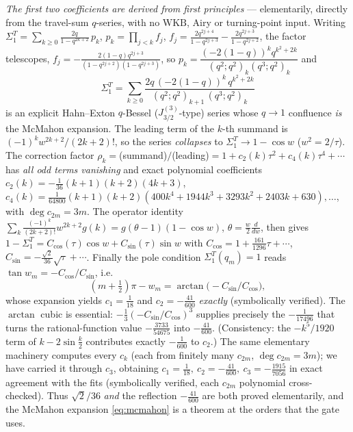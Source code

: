 \emph{The first two coefficients are derived from first principles} --- elementarily, directly from the
travel-sum $q$-series, with no $\mathrm{WKB}$, Airy or turning-point input. Writing
$\Sigma_1^T=\sum_{k\ge0}\frac{2q}{1-q^{2k+2}}\,p_k$, $p_k=\prod_{j<k}f_j$,
$f_j=\frac{2q^{2j+4}}{1-q^{2j+3}}-\frac{2q^{2j+3}}{1-q^{2j+2}}$, the factor telescopes,
$f_j=-\tfrac{2(1-q)q^{2j+3}}{(1-q^{2j+2})(1-q^{2j+3})}$, so $p_k=\dfrac{(-2(1-q))^kq^{k^2+2k}}{(q^2;q^2)_k(q^3;q^2)_k}$
and
\begin{equation}\label{eq:sigtclosed}
  \Sigma_1^T=\sum_{k\ge0}\frac{2q\,(-2(1-q))^k\,q^{k^2+2k}}{(q^2;q^2)_{k+1}\,(q^3;q^2)_k}
\end{equation}
is an explicit Hahn--Exton $q$-Bessel ($J^{(3)}_{3/2}$-type) series whose $q\to1$ confluence \emph{is} the McMahon
expansion. The leading term of the $k$-th summand is
$(-1)^kw^{2k+2}/(2k+2)!$, so the series \emph{collapses} to $\Sigma_1^T\to1-\cos w$ ($w^2=2/\tau$). The
correction factor $\rho_k=$(summand)$/$(leading)$=1+c_2(k)\tau^2+c_4(k)\tau^4+\cdots$ has \emph{all odd terms
vanishing} and exact polynomial coefficients $c_2(k)=-\tfrac1{36}(k+1)(k+2)(4k+3)$, $c_4(k)=\tfrac1{64800}
(k+1)(k+2)(400k^4+1944k^3+3293k^2+2403k+630),\dots$, with $\deg c_{2m}=3m$. The operator identity
$\sum_k\frac{(-1)^k}{(2k+2)!}w^{2k+2}g(k)=g(\theta-1)(1-\cos w)$, $\theta=\tfrac{w}2\frac{d}{dw}$, then gives
$1-\Sigma_1^T=C_{\cos}(\tau)\cos w+C_{\sin}(\tau)\sin w$ with
$C_{\cos}=1+\tfrac{161}{1296}\tau+\cdots$, $C_{\sin}=-\tfrac{\sqrt2}{36}\sqrt\tau+\cdots$. Finally the pole
condition $\Sigma_1^T(q_m)=1$ reads $\tan w_m=-C_{\cos}/C_{\sin}$, i.e.
\begin{equation}\label{eq:devarctan}
  (m+\tfrac12)\pi-w_m=\arctan\!\bigl(-C_{\sin}/C_{\cos}\bigr),
\end{equation}
whose expansion yields $c_1=\tfrac1{18}$ and $c_2=-\tfrac{41}{600}$ \emph{exactly} (symbolically verified). The
$\arctan$ cubic is essential: $-\tfrac13(-C_{\sin}/C_{\cos})^3$ supplies precisely the $-\tfrac1{17496}$ that
turns the rational-function value $-\tfrac{3733}{54675}$ into $-\tfrac{41}{600}$. \textup(Consistency: the
$-k^5/1920$ term of $k-2\sin\tfrac k2$ contributes exactly $-\tfrac1{600}$ to $c_2$.\textup) The same elementary
machinery computes every $c_k$ (each from finitely many $c_{2m}$, $\deg c_{2m}=3m$); we have carried it through
$c_3$, obtaining $c_1=\tfrac1{18},\ c_2=-\tfrac{41}{600},\ c_3=-\tfrac{1915}{7056}$ in exact agreement with the
fits (symbolically verified, each $c_{2m}$ polynomial cross-checked). Thus $\sqrt2/36$ \emph{and} the reflection
$-\tfrac{41}{600}$ are both proved elementarily, and the McMahon expansion \eqref{eq:mcmahon} is a theorem at the
orders that the gate uses.

